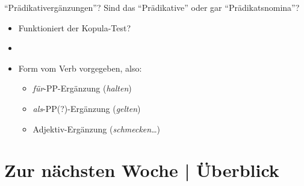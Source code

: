 \begin{frame}
  {"`Prädikativergänzungen"'?}
  \pause
  Sind das "`Prädikative"' oder gar "`Prädikatsnomina"'?\\
  \Halbzeile
  \pause
  \begin{exe}
    \ex\label{ex:praedikative032}
    \begin{xlist}
    \end{xlist}
  \end{exe}
  \pause
  \begin{itemize}[<+->]
    \item Funktioniert der Kopula-Test?
    \item {}
    \item \alert{Form vom Verb vorgegeben}, also:
      \begin{itemize}[<+->]
        \item \textit{für}-PP-Ergänzung (\textit{halten})
        \item \textit{als}-PP(?)-Ergänzung (\textit{gelten})
        \item Adjektiv-Ergänzung (\textit{schmecken}\ldots)\\
      \end{itemize}
  \end{itemize}
\end{frame}

\ifdefined\TITLE
  \section{Zur nächsten Woche | Überblick}

